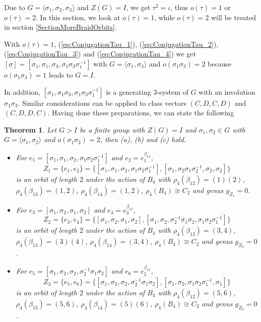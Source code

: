 \documentclass[12pt,a4paper]{article}
\newtheorem{theorem}{Theorem}[section]
\numberwithin{equation}{section}
\numberwithin{table}{section}
\begin{document}
Due to $G=\langle \sigma_1, \sigma_2, \sigma_3 \rangle$ and $Z(G)=I$, we get $\tau^2 = \iota$,
thus $o(\tau)=1$ or $o(\tau)=2$. In this section, we look at $o(\tau)=1$, while $o(\tau)=2$ will 
be treated in section \ref{SectionMoreBraidOrbits}.
\par
\noindent
With $o(\tau)=1$, (\ref{eq:ConjugationTau_1}), (\ref{eq:ConjugationTau_2}), (\ref{eq:ConjugationTau_3}) and (\ref{eq:ConjugationTau_4})
we get $[\underline{\sigma}]=[\sigma_1,\sigma_1,\sigma_3,\sigma_1 \sigma_3 \sigma^{-1}_1]$
with $G=\langle \sigma_1, \sigma_3 \rangle$ and $o(\sigma_1 \sigma_3)=2$ because $o(\sigma_1 \sigma_3)=1$ leads to $G=I$.
\par
\noindent
In addition, $[\sigma_1,\sigma_1 \sigma_3,\sigma_1 \sigma_3 \sigma^{-1}_1]$ is a generating $3$-system of $G$ with
an involution $\sigma_1 \sigma_3$. Similar considerations can be applied to class vectors $(C,D,C,D)$ and $(C,D,D,C)$.
Having done these preparations, we can state the following
%
\begin{theorem}
\label{BraidOrbitsOfSize2}
Let $G>I$ be a finite group with $Z(G)=I$ and $\sigma_1, \sigma_2 \in G$ with
$G=\langle \sigma_1, \sigma_2 \rangle$ and $o(\sigma_1 \sigma_2)=2$, then (a), (b) and (c) hold.
\begin{itemize}
\item[(a)]
For $e_1=[\sigma_1,\sigma_1, \sigma_2,\sigma_1 \sigma_2 \sigma^{-1}_1]$ and $e_2=e_1^{\beta_{13}}$,
$$Z_1=\{ e_1, e_2 \}=\{ [\sigma_1,\sigma_1, \sigma_2,\sigma_1 \sigma_2 \sigma^{-1}_1], 
[\sigma_1,\sigma_2 \sigma_1 \sigma^{-1}_2,\sigma_2,\sigma_2] \}$$
is an orbit of length $2$ under the action of $B_4$ with
$\rho_4(\beta_{12})=(1)(2)$,
$\rho_4(\beta_{13})=(1,2)$,
$\rho_4(\beta_{14})=(1,2)$,
$\rho_4(B_4)\cong C_2$
and genus $g_{Z_1}=0$.
\item[(b)]
For $e_3=[\sigma_1,\sigma_2,\sigma_1,\sigma_2]$ and $e_4=e_3^{\beta_{12}}$,
$$Z_2=\{ e_3, e_4 \}=\{ [\sigma_1,\sigma_2,\sigma_1,\sigma_2], 
[\sigma_1,\sigma_2,\sigma^{-1}_2 \sigma_1 \sigma_2,\sigma_1 \sigma_2 \sigma^{-1}_1] \}$$
is an orbit of length $2$ under the action of $B_4$ with
$\rho_4(\beta_{12})=(3,4)$,
$\rho_4(\beta_{13})=(3)(4)$,
$\rho_4(\beta_{14})=(3,4)$,
$\rho_4(B_4)\cong C_2$
and genus $g_{Z_2}=0$.
\item[(c)]
For $e_5=[\sigma_1,\sigma_2,\sigma_2,\sigma^{-1}_2 \sigma_1 \sigma_2]$ and $e_6=e_5^{\beta_{12}}$,
$$Z_3=\{ e_5, e_6 \}=\{ [\sigma_1,\sigma_2,\sigma_2,\sigma^{-1}_2 \sigma_1 \sigma_2], 
[\sigma_1,\sigma_2,\sigma_1 \sigma_2 \sigma^{-1}_1,\sigma_1] \}$$
is an orbit of length $2$ under the action of $B_4$ with
$\rho_4(\beta_{12})=(5,6)$,
$\rho_4(\beta_{13})=(5,6)$,
$\rho_4(\beta_{14})=(5)(6)$,
$\rho_4(B_4)\cong C_2$
and genus $g_{Z_3}=0$.
\end{itemize}
\end{theorem}
\end{document}
